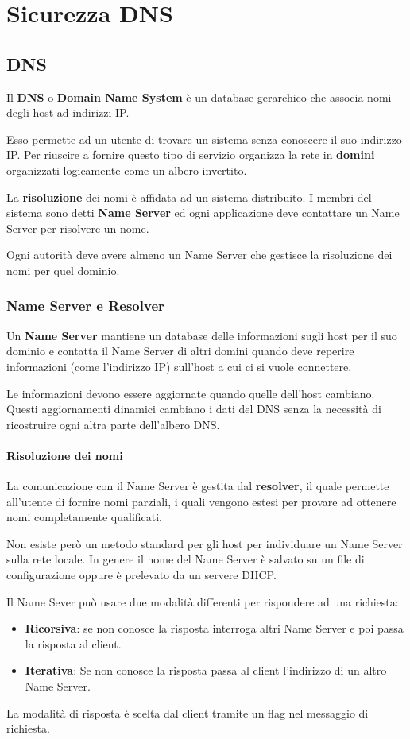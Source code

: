 \chapter{Sicurezza DNS}
\section{DNS}
Il \textbf{DNS} o \textbf{Domain Name System} è un database gerarchico che associa nomi degli host ad indirizzi IP.

Esso permette ad un utente di trovare un sistema senza conoscere il suo indirizzo IP. Per riuscire a fornire questo
tipo di servizio organizza la rete in \textbf{domini} organizzati logicamente come un albero invertito.

La \textbf{risoluzione} dei nomi è affidata ad un sistema distribuito. I membri del sistema sono detti
\textbf{Name Server} ed ogni applicazione deve contattare un Name Server per risolvere un nome.

Ogni autorità deve avere almeno un Name Server che gestisce la risoluzione dei nomi per quel dominio.

\subsection{Name Server e Resolver}
Un \textbf{Name Server} mantiene un database delle informazioni sugli host per il suo dominio e contatta il Name
Server di altri domini quando deve reperire informazioni (come l'indirizzo IP) sull'host a cui ci si vuole connettere.

Le informazioni devono essere aggiornate quando quelle dell'host cambiano. Questi aggiornamenti dinamici cambiano i
dati del DNS senza la necessità di ricostruire ogni altra parte dell'albero DNS.

\subsubsection{Risoluzione dei nomi}
La comunicazione con il Name Server è gestita dal \textbf{resolver}, il quale permette all'utente di fornire nomi
parziali, i quali vengono estesi per provare ad ottenere nomi completamente qualificati.

Non esiste però un metodo standard per gli host per individuare un Name Server sulla rete locale. In genere il nome
del Name Server è salvato su un file di configurazione oppure è prelevato da un servere DHCP.

Il Name Sever può usare due modalità differenti per rispondere ad una richiesta:
\begin{itemize}
	\item \textbf{Ricorsiva}: se non conosce la risposta interroga altri Name Server e poi passa la risposta al
	      client.
	\item \textbf{Iterativa}: Se non conosce la risposta passa al client l'indirizzo di un altro Name Server.
\end{itemize}
La modalità di risposta è scelta dal client tramite un flag nel messaggio di richiesta.

